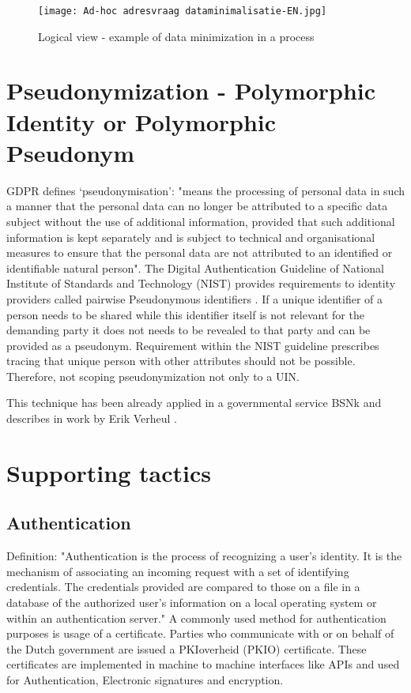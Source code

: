     \begin{figure}
        \graphicspath{ {./images/} }
        \centering
        \texttt{[image: Ad-hoc adresvraag dataminimalisatie-EN.jpg]}\\
        \caption{Logical view - example of data minimization in a process}
        \label{fig:Adhoc}
    \end{figure}

\section{Pseudonymization - Polymorphic Identity or Polymorphic Pseudonym}
GDPR \cite{GDPR} defines ‘pseudonymisation’: "means the processing of personal data in such a manner that the personal data can no longer be attributed to a specific data subject without the use of additional information, provided that such additional information is kept separately and is subject to technical and organisational measures to ensure that the personal data are not attributed to an identified or identifiable natural person". The Digital Authentication Guideline of National Institute of Standards and Technology (NIST) provides requirements to identity providers called pairwise Pseudonymous identifiers \cite{NIST_800-63C}. If a unique identifier of a person needs to be shared while this identifier itself is not relevant for the demanding party it does not needs to be revealed to that party and can be provided as a pseudonym. Requirement within the NIST guideline prescribes tracing that unique person with other attributes should not be possible. Therefore, not scoping pseudonymization not only to a UIN.

This technique has been already applied in a governmental service BSNk \cite{Logius_BSNk} and describes in work by Erik Verheul \cite{VerheuleID}.

\section{Supporting tactics}

\subsection{Authentication} \label{authentication}
Definition: "Authentication is the process of recognizing a user’s identity. It is the mechanism of associating an incoming request with a set of identifying credentials. The credentials provided are compared to those on a file in a database of the authorized user’s information on a local operating system or within an authentication server." \cite{authentication}
A commonly used method for authentication purposes is usage of a certificate. Parties who communicate with or on behalf of the Dutch government are issued a PKIoverheid (PKIO) certificate. These certificates are implemented in machine to machine interfaces like APIs and used for Authentication, Electronic signatures and encryption. \cite{Logius_PKIO}

